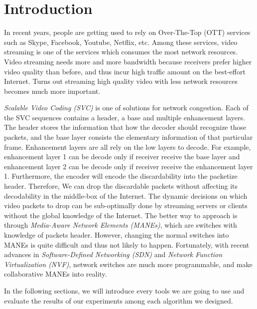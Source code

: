 \section{Introduction} \label{sec:introduction}

In recent years, people are getting used to rely on Over-The-Top (OTT) 
services such as Skype, Facebook, Youtube, Netflix, etc. 
Among these services, video streaming is one of the services which 
consumes the most network resources. Video streaming needs more and more bandwidth because receivers prefer higher video quality than before, and thus incur high traffic amount on the best-effort Internet. Turns out streaming high quality video with less network resources becomes much more important.

{\em Scalable Video Coding (SVC) }is one of solutions for network congestion. Each of the SVC sequences contains a header, a base and multiple enhancement layers. The header stores the information that how the decoder should recognize those packets, and the base layer consists the elementary information of that particular frame. Enhancement layers are all rely on the low layers to decode. For example, enhancement layer 1 can be decode only if receiver receive the base layer and enhancement layer 2 can be decode only if receiver receive the enhancement layer 1. Furthermore, the encoder will encode the discardability into the packetize header. Therefore, We can drop the discardable packets without affecting its decodability in the middle-box of the Internet. The dynamic decisions on which video packets to drop can be sub-optimally done by streaming servers or clients without the global knowledge of the Internet. The better way to approach is through {\em Media-Aware Network Elements (MANEs)}, which are switches with knowledge of packets header. However, changing the normal switches into MANEs is quite difficult and thus not likely to happen. Fortunately, with recent advances in {\em Software-Defined Networking (SDN)} and {\em Network Function Virtualization (NVF)}, network switches are much more programmable, and make collaborative MANEs into reality. 

In the following sections, we will introduce every tools we are going to use and evaluate the results of our experiments among each algorithm we designed.